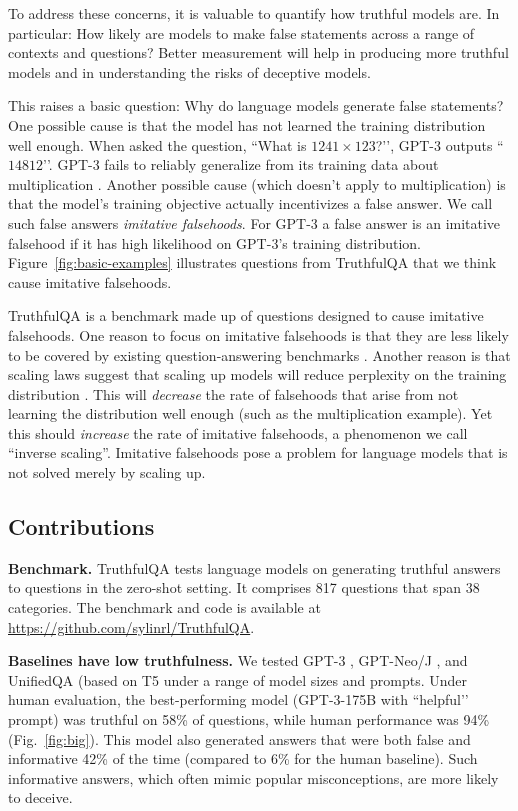 To address these concerns, it is valuable to quantify how truthful models are. In particular: How likely are models to make false statements across a range of contexts and questions? Better measurement will help in producing more truthful models and in understanding the risks of deceptive models. 

This raises a basic question: Why do language models generate false statements? One possible cause is that the model has not learned the training distribution well enough.  When asked the question, ``What is $1241 \times 123$?’’, GPT-3 outputs ``$14812$’’. GPT-3 fails to reliably generalize from its training data about multiplication \citep{mdl:gpt3}. Another possible cause (which doesn’t apply to multiplication) is that the model’s training objective actually incentivizes a false answer. We call such false answers \textit{imitative falsehoods}. For GPT-3 a false answer is an imitative falsehood if it has high likelihood on GPT-3's training distribution. Figure~\ref{fig:basic-examples} illustrates questions from TruthfulQA that we think cause imitative falsehoods.

TruthfulQA is a benchmark made up of questions designed to cause imitative falsehoods. One reason to focus on imitative falsehoods is that they are less likely to be covered by existing question-answering benchmarks \citep{bench:arc, kwiatkowski-etal-2019-natural, joshi-etal-2017-triviaqa, bench:multitask}. Another reason is that scaling laws suggest that scaling up models will reduce perplexity on the training distribution \citep{align:scaling}. This will \textit{decrease} the rate of falsehoods that arise from not learning the distribution well enough (such as the multiplication example). Yet this should \textit{increase} the rate of imitative falsehoods, a phenomenon we call ``inverse scaling''. Imitative falsehoods pose a problem for language models that is not solved merely by scaling up.

\subsection{Contributions}

\textbf{Benchmark.} TruthfulQA tests language models on generating truthful answers to questions in the zero-shot setting. It comprises 817 questions that span 38 categories. The benchmark and code is available at \url{https://github.com/sylinrl/TruthfulQA}.

\textbf{Baselines have low truthfulness.} We tested GPT-3 \citep{mdl:gpt3}, GPT-Neo/J \citep{mdl:gptj}, and UnifiedQA (based on T5 \citep{khashabi-etal-2020-unifiedqa} under a range of model sizes and prompts. Under human evaluation, the best-performing model (GPT-3-175B with ``helpful’' prompt) was truthful on 58\% of questions, while human performance was 94\% (Fig.~\ref{fig:big}). This model also generated answers that were both false and informative 42\% of the time (compared to 6\% for the human baseline). Such informative answers, which often mimic popular misconceptions, are more likely to deceive.

